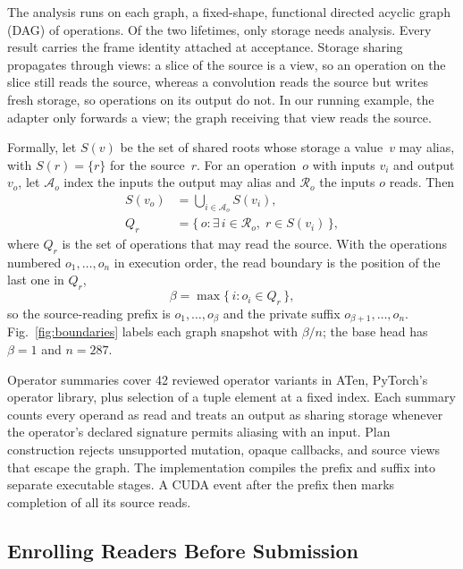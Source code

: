 \documentclass[conference]{IEEEtran}
\begin{document}
The analysis runs on each graph, a fixed-shape, functional directed acyclic graph (DAG) of operations. Of the two lifetimes, only storage needs analysis. Every result carries the frame identity attached at acceptance. Storage sharing propagates through views: a slice of the source is a view, so an operation on the slice still reads the source, whereas a convolution reads the source but writes fresh storage, so operations on its output do not. In our running example, the adapter only forwards a view; the graph receiving that view reads the source.

Formally, let $S(v)$ be the set of shared roots whose storage a value~$v$ may alias, with $S(r)=\{r\}$ for the source~$r$. For an operation~$o$ with inputs $v_i$ and output $v_o$, let $\mathcal{A}_o$ index the inputs the output may alias and $\mathcal{R}_o$ the inputs $o$ reads. Then
\begin{equation}
\begin{aligned}
S(v_o)&=\textstyle\bigcup_{i\in \mathcal{A}_o} S(v_i),\\
Q_r&=\{\, o : \exists\, i\in \mathcal{R}_o,\; r\in S(v_i) \,\},
\end{aligned}\label{eq:reads}
\end{equation}
where $Q_r$ is the set of operations that may read the source. With the operations numbered $o_1,\dots,o_n$ in execution order, the read boundary is the position of the last one in $Q_r$,
\begin{equation}
\beta=\max\{\, i : o_i\in Q_r \,\}, \label{eq:boundary}
\end{equation}
so the source-reading prefix is $o_1,\dots,o_\beta$ and the private suffix $o_{\beta+1},\dots,o_n$. Fig.~\ref{fig:boundaries} labels each graph snapshot with $\beta/n$; the base head has $\beta=1$ and $n=287$.

Operator summaries cover 42 reviewed operator variants in ATen, PyTorch's operator library, plus selection of a tuple element at a fixed index. Each summary counts every operand as read and treats an output as sharing storage whenever the operator's declared signature permits aliasing with an input. Plan construction rejects unsupported mutation, opaque callbacks, and source views that escape the graph. The implementation compiles the prefix and suffix into separate executable stages. A CUDA event after the prefix then marks completion of all its source reads.

\subsection{Enrolling Readers Before Submission}
\label{sec:enroll}
\end{document}
